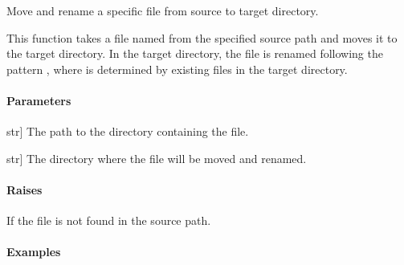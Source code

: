 \documentclass[letterpaper,10pt,english]{sphinxmanual}
\begin{document}
\begin{fulllineitems}
\label{\detokenize{main.utils:main.utils.utils.rename_and_move}}
\pysigstartsignatures
{}
\pysigstopsignatures
\sphinxAtStartPar
Move and rename a specific file from source to target directory.

\sphinxAtStartPar
This function takes a file named  from the specified source path
and moves it to the target directory. In the target directory, the file is
renamed following the pattern , where  is determined
by existing files in the target directory.


\paragraph{Parameters}
\label{\detokenize{main.utils:id1}}\begin{description}
\sphinxlineitem{source\_path}{[}str{]}
\sphinxAtStartPar
The path to the directory containing the  file.

\sphinxlineitem{target\_dir}{[}str{]}
\sphinxAtStartPar
The directory where the file will be moved and renamed.

\end{description}


\paragraph{Raises}
\label{\detokenize{main.utils:raises}}\begin{description}
\sphinxAtStartPar
If the  file is not found in the source path.

\end{description}


\paragraph{Examples}
\label{\detokenize{main.utils:examples}}
\begin{sphinxVerbatim}[commandchars=\\\{\}]
 
\end{sphinxVerbatim}

\end{fulllineitems}
\end{document}
